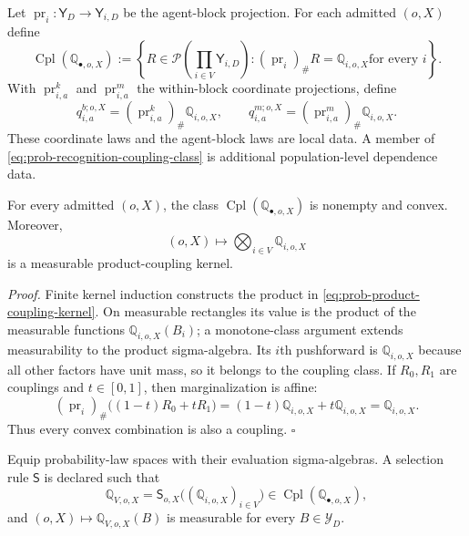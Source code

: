 \medskip
{}
Let $\operatorname{pr}_i:\mathsf Y_D\to\mathsf Y_{i,D}$ be the agent-block projection. For each admitted $(o,X)$ define
\begin{equation}
\operatorname{Cpl}(\mathbb Q_{\bullet,o,X})
:=
\left\{
R\in\mathcal P\left(\prod_{i\in V}\mathsf Y_{i,D}\right):
(\operatorname{pr}_i)_\#R=\mathbb Q_{i,o,X} \text{for every }i
\right\}.
\label{eq:prob-recognition-coupling-class}
\end{equation}
With $\operatorname{pr}^{k}_{i,a}$ and $\operatorname{pr}^{m}_{i,a}$ the within-block coordinate projections, define
\begin{equation}
q^{b;o,X}_{i,a}=(\operatorname{pr}^{k}_{i,a})_\#\mathbb Q_{i,o,X},
\qquad
q_{i,a}^{m;o,X}=(\operatorname{pr}^{m}_{i,a})_\#\mathbb Q_{i,o,X}.
\label{eq:prob-recognition-marginals}
\end{equation}
These coordinate laws and the agent-block laws are local data. A member of \eqref{eq:prob-recognition-coupling-class} is additional population-level dependence data. 
\medskip

For every admitted $(o,X)$, the class $\operatorname{Cpl}(\mathbb Q_{\bullet,o,X})$ is nonempty and convex. Moreover,
\begin{equation}
(o,X)\longmapsto\bigotimes_{i\in V}\mathbb Q_{i,o,X}
\label{eq:prob-product-coupling-kernel}
\end{equation}
is a measurable product-coupling kernel. 
\medskip

\noindent\emph{Proof.} Finite kernel induction constructs the product in \eqref{eq:prob-product-coupling-kernel}. On measurable rectangles its value is the product of the measurable functions $\mathbb Q_{i,o,X}(B_i)$; a monotone-class argument extends measurability to the product sigma-algebra. Its $i$th pushforward is $\mathbb Q_{i,o,X}$ because all other factors have unit mass, so it belongs to the coupling class. If $R_0,R_1$ are couplings and $t\in[0,1]$, then marginalization is affine:
\[
(\operatorname{pr}_i)_\#\bigl((1-t)R_0+tR_1\bigr)
=(1-t)\mathbb Q_{i,o,X}+t\mathbb Q_{i,o,X}
=\mathbb Q_{i,o,X}.
\]
Thus every convex combination is also a coupling. \hfill$\square$

\medskip
{}
Equip probability-law spaces with their evaluation sigma-algebras. A selection rule $\mathsf S$ is declared such that
\begin{equation}
\mathbb Q_{V,o,X}
=
\mathsf S_{o,X}\bigl((\mathbb Q_{i,o,X})_{i\in V}\bigr)
\in\operatorname{Cpl}(\mathbb Q_{\bullet,o,X}),
\label{eq:prob-selected-recognition-coupling}
\end{equation}
and $(o,X)\mapsto\mathbb Q_{V,o,X}(B)$ is measurable for every $B\in\mathscr Y_D$. 
\medskip

